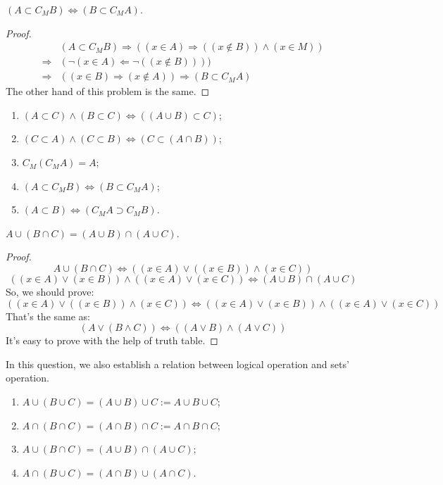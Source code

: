 \begin{question}
    $(A\subset C_{M}B)\Leftrightarrow (B\subset C_{M}A)$.
\end{question}
\begin{proof}
    \[\begin{aligned}
        &(A\subset C_{M}B)\Rightarrow ((x\in A)\Rightarrow((x\not\in B))\wedge(x\in M))\\ \Rightarrow& (\lnot(x\in A)\Leftarrow \lnot((x\not\in B))))\\
        \Rightarrow&((x\in B)\Rightarrow(x\not\in A))\Rightarrow(B\subset C_{M}A)
    \end{aligned}\]
    The other hand of this problem is the same.
\end{proof}
\begin{tips}
    \begin{enumerate}
        \item $(A\subset C)\wedge(B\subset C)\Leftrightarrow((A\cup B)\subset C)$;
        \item $(C\subset A)\wedge(C\subset B)\Leftrightarrow (C\subset(A\cap B))$;
        \item $C_{M}(C_{M}A)=A$;
        \item $(A\subset C_{M}B)\Leftrightarrow (B\subset C_{M}A)$;
        \item $(A\subset B)\Leftrightarrow(C_{M}A\supset C_{M}B)$.
    \end{enumerate}
\end{tips}
\begin{question}
    $A\cup (B\cap C)=(A\cup B)\cap (A\cup C)$.
\end{question}
\begin{proof}
    \[
        A\cup (B\cap C)\Leftrightarrow((x\in A)\vee ((x\in B))\wedge(x\in C))
    \]
    \[((x\in A)\vee(x\in B))\wedge((x\in A)\vee(x\in C))\Leftrightarrow(A\cup B)\cap (A\cup C)\]
    So, we should prove:
    \[((x\in A)\vee ((x\in B))\wedge(x\in C))\Leftrightarrow((x\in A)\vee(x\in B))\wedge((x\in A)\vee(x\in C))\]
    That's the same as:
    \[(A\vee(B\wedge C))\Leftrightarrow((A\vee B)\wedge(A\vee C))\]
    It's easy to prove with the help of truth table.
\end{proof}
In this question, we also establish a relation between logical operation and sets' operation.
\begin{tips}
    \begin{enumerate}
        \item $A\cup (B\cup C)=(A\cup B)\cup C:=A\cup B\cup C$;
        \item $A\cap (B\cap C)=(A\cap B)\cap C:=A\cap B\cap C$;
        \item $A\cup (B\cap C)=(A\cup B)\cap (A\cup C)$;
        \item $A\cap (B\cup C)=(A\cap B)\cup (A\cap C)$.
    \end{enumerate}
\end{tips}

